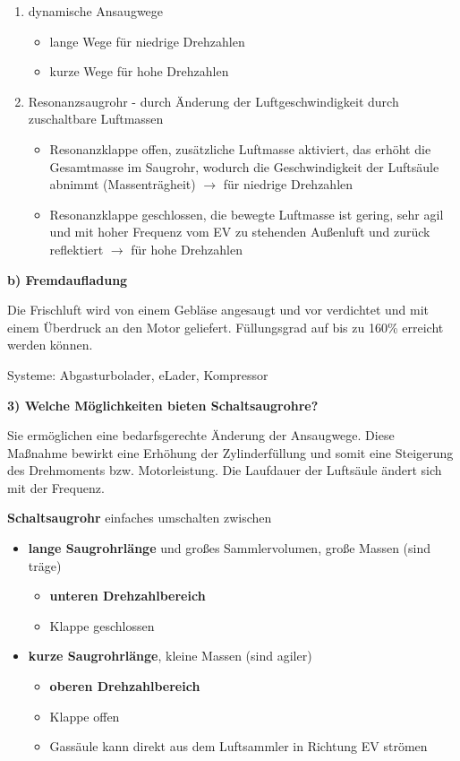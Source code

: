 \begin{enumerate}
\item
  dynamische Ansaugwege

  \begin{itemize}
  \item
    lange Wege für niedrige Drehzahlen
  \item
    kurze Wege für hohe Drehzahlen
  \end{itemize}
\item
  Resonanzsaugrohr - durch Änderung der Luftgeschwindigkeit durch
  zuschaltbare Luftmassen

  \begin{itemize}
  \item
    Resonanzklappe offen, zusätzliche Luftmasse aktiviert, das erhöht
    die Gesamtmasse im Saugrohr, wodurch die Geschwindigkeit der
    Luftsäule abnimmt (Massenträgheit) $\to$ für niedrige Drehzahlen
  \item
    Resonanzklappe geschlossen, die bewegte Luftmasse ist gering, sehr
    agil und mit hoher Frequenz vom EV zu stehenden Außenluft und zurück
    reflektiert $\to$ für hohe Drehzahlen
  \end{itemize}
\end{enumerate}

\textbf{b) Fremdaufladung}

Die Frischluft wird von einem Gebläse angesaugt und vor verdichtet und
mit einem Überdruck an den Motor geliefert. Füllungsgrad auf bis zu
160\% erreicht werden können.

Systeme: Abgasturbolader, eLader, Kompressor

\textbf{3) Welche Möglichkeiten bieten Schaltsaugrohre?}

Sie ermöglichen eine bedarfsgerechte Änderung der Ansaugwege. Diese
Maßnahme bewirkt eine Erhöhung der Zylinderfüllung und somit eine
Steigerung des Drehmoments bzw. Motorleistung. Die Laufdauer der
Luftsäule ändert sich mit der Frequenz.

\textbf{Schaltsaugrohr} einfaches umschalten zwischen

\begin{itemize}
\item
  \textbf{lange Saugrohrlänge} und großes Sammlervolumen, große Massen
  (sind träge)

  \begin{itemize}
  \item
    \textbf{unteren Drehzahlbereich}
  \item
    Klappe geschlossen
  \end{itemize}
\item
  \textbf{kurze Saugrohrlänge}, kleine Massen (sind agiler)

  \begin{itemize}
  \item
    \textbf{oberen Drehzahlbereich}
  \item
    Klappe offen
  \item
    Gassäule kann direkt aus dem Luftsammler in Richtung EV strömen
  \end{itemize}
\end{itemize}

